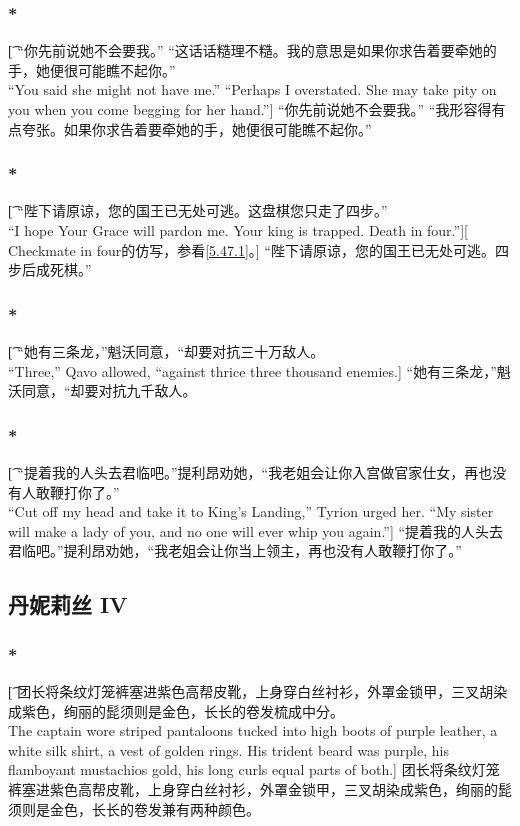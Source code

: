 \documentclass[12pt,a4paper]{article}
\begin{document}
\subsubsection{\color{red}*}\t[
	“你先前说她不会要我。” “这话话糙理不糙。我的意思是如果你求告着要牵她的手，她便很可能瞧不起你。”\\
	“You said she might not have me.” “Perhaps I overstated. She may take pity on you when you come begging for her hand.”]
	“你先前说她不会要我。” “我形容得有点夸张。如果你求告着要牵她的手，她便很可能瞧不起你。”
	
\subsubsection{\color{red}*}\label{5.22.4}\t[
	“陛下请原谅，您的国王已无处可逃。这盘棋您只走了四步。”\\
	“I hope Your Grace will pardon me. Your king is trapped. Death in four.”][
	Checkmate in four的仿写，参看\ref{5.47.1}。]
	“陛下请原谅，您的国王已无处可逃。四步后成死棋。”
	
\subsubsection{\color{red}*}\t[
	“她有三条龙，”魁沃同意，“却要对抗三十万敌人。\\
	“Three,” Qavo allowed, “against thrice three thousand enemies.]
	“她有三条龙，”魁沃同意，“却要对抗九千敌人。
	
\subsubsection{\color{red}*}\t[
	“提着我的人头去君临吧。”提利昂劝她，“我老姐会让你入宫做官家仕女，再也没有人敢鞭打你了。”\\
	“Cut off my head and take it to King's Landing,” Tyrion urged her. “My sister will make a lady of you, and no one will ever whip you again.”]
	“提着我的人头去君临吧。”提利昂劝她，“我老姐会让你当上领主，再也没有人敢鞭打你了。”
	
\subsection{丹妮莉丝 IV}
\subsubsection{\color{red}*}\t[
	团长将条纹灯笼裤塞进紫色高帮皮靴，上身穿白丝衬衫，外罩金锁甲，三叉胡染成紫色，绚丽的髭须则是金色，长长的卷发梳成中分。\\
	The captain wore striped pantaloons tucked into high boots of purple leather, a white silk shirt, a vest of golden rings. His trident beard was purple, his flamboyant mustachios gold, his long curls equal parts of both.]
	团长将条纹灯笼裤塞进紫色高帮皮靴，上身穿白丝衬衫，外罩金锁甲，三叉胡染成紫色，绚丽的髭须则是金色，长长的卷发兼有两种颜色。
	
\end{document}
